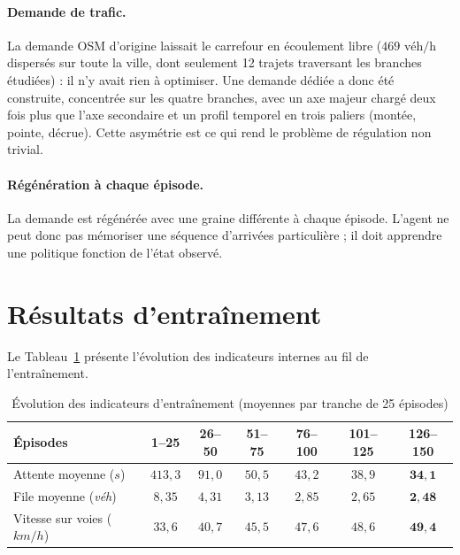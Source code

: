 \documentclass[11pt,a4paper]{article}
\begin{document}
\paragraph{Demande de trafic.} La demande OSM d'origine laissait le carrefour en
écoulement libre ($469\text{ véh/h}$ dispersés sur toute la ville, dont seulement 12
trajets traversant les branches étudiées) : il n'y avait rien à optimiser. Une
demande dédiée a donc été construite, concentrée sur les quatre branches, avec un
axe majeur chargé deux fois plus que l'axe secondaire et un profil temporel en trois
paliers (montée, pointe, décrue). Cette asymétrie est ce qui rend le problème de
régulation non trivial.

\paragraph{Régénération à chaque épisode.} La demande est régénérée avec une graine
différente à chaque épisode. L'agent ne peut donc pas mémoriser une séquence
d'arrivées particulière ; il doit apprendre une politique fonction de l'état observé.

\section{Résultats d'entraînement}

Le Tableau~\ref{tab:metrics_summary} présente l'évolution des indicateurs internes
au fil de l'entraînement.

\begin{table}[H]
\centering
\caption{Évolution des indicateurs d'entraînement (moyennes par tranche de 25 épisodes)}
\label{tab:metrics_summary}
\vspace{0.2cm}
\begin{tabular}{lcccccc}
\toprule
\textbf{Épisodes} & \textbf{1--25} & \textbf{26--50} & \textbf{51--75} & \textbf{76--100} & \textbf{101--125} & \textbf{126--150} \\
\midrule
Attente moyenne ($s$)          & $413{,}3$ & $91{,}0$ & $50{,}5$ & $43{,}2$ & $38{,}9$ & $\mathbf{34{,}1}$ \\
File moyenne (\textit{véh})    & $8{,}35$  & $4{,}31$ & $3{,}13$ & $2{,}85$ & $2{,}65$ & $\mathbf{2{,}48}$ \\
Vitesse sur voies ($km/h$)     & $33{,}6$  & $40{,}7$ & $45{,}5$ & $47{,}6$ & $48{,}6$ & $\mathbf{49{,}4}$ \\
\bottomrule
\end{tabular}
\end{table}
\end{document}
